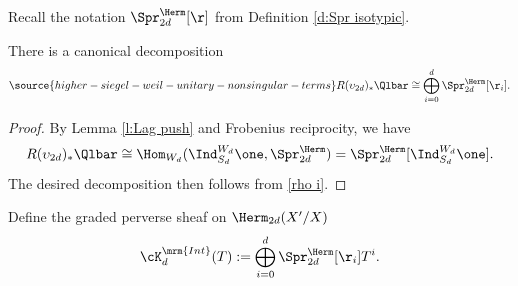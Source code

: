 Recall the notation $\Spr^{\Herm}_{2d}[\r]$ from Definition \ref{d:Spr isotypic}.
\begin{cor}
\notready\label{c:Lag decomp} There is a canonical decomposition
\begin{equation}\label{decomp ph}
\source{higher-siegel-weil-unitary-nonsingular-terms}
R(\upsilon_{2d})_{*}\Qlbar\cong\bigoplus_{i=0}^{d}\Spr^{\Herm}_{2d}[\r_{i}].
\end{equation}
\end{cor}
\begin{proof}
By Lemma \ref{l:Lag push} and Frobenius reciprocity,  we have
\begin{equation}
R(\upsilon_{2d})_{*}\Qlbar\cong \Hom_{W_{d}}(\Ind_{S_{d}}^{W_{d}}\one, \Spr^{\Herm}_{2d})=\Spr^{\Herm}_{2d}[\Ind_{S_{d}}^{W_{d}}\one].
\end{equation}
The desired decomposition then follows from \eqref{rho i}.
\end{proof}


\begin{defn}
\notready\label{def:Kd}
Define the graded perverse sheaf on $\Herm_{2d}(X'/X)$
\begin{equation}
\cK_{d}^{\mrm{Int}}(T) := \bigoplus_{i=0}^d \Spr^{\Herm}_{2d}[\r_{i}] T^{i}.
\end{equation}
\end{defn}





